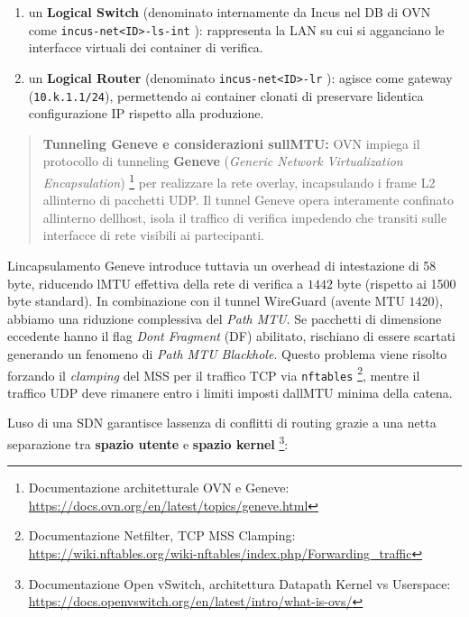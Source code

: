 \begin{enumerate}
\def\labelenumi{\arabic{enumi}.}
\tightlist
\item
  un \textbf{Logical Switch} (denominato internamente da Incus nel DB di
  OVN come \passthrough{\lstinline!incus-net<ID>-ls-int!} ):
  rappresenta la LAN su cui si agganciano le interfacce virtuali dei
  container di verifica.
\item
  un \textbf{Logical Router} (denominato
  \passthrough{\lstinline!incus-net<ID>-lr!} ):
  agisce come gateway (\passthrough{\lstinline!10.k.1.1/24!}),
  permettendo ai container clonati di preservare
  l\textquotesingle identica configurazione IP rispetto alla produzione.
\end{enumerate}

\begin{quote}
\textbf{Tunneling Geneve e considerazioni sull\textquotesingle MTU:} OVN
impiega il protocollo di tunneling \textbf{Geneve} (\emph{Generic
Network Virtualization Encapsulation}) \footnote{\label{fn:ref_17}Documentazione
  architetturale OVN e Geneve:
  \url{https://docs.ovn.org/en/latest/topics/geneve.html}} per
realizzare la rete overlay, incapsulando i frame L2
all\textquotesingle interno di pacchetti UDP. Il tunnel Geneve opera
interamente confinato all\textquotesingle interno
dell\textquotesingle host, isola il traffico di verifica impedendo che
transiti sulle interfacce di rete visibili ai partecipanti.
\end{quote}

L\textquotesingle incapsulamento Geneve introduce tuttavia un overhead
di intestazione di 58 byte, riducendo l\textquotesingle MTU effettiva
della rete di verifica a \(1442\) byte (rispetto ai 1500 byte standard).
In combinazione con il tunnel WireGuard (avente MTU \(1420\)), abbiamo
una riduzione complessiva del \emph{Path MTU}. Se pacchetti di
dimensione eccedente hanno il flag \emph{Don\textquotesingle t Fragment}
(DF) abilitato, rischiano di essere scartati generando un fenomeno di
\emph{Path MTU Blackhole}. Questo problema viene risolto forzando il
\emph{clamping} del MSS per il traffico TCP via
\passthrough{\lstinline!nftables!} \footnote{\label{fn:ref_18}Documentazione Netfilter,
  TCP MSS Clamping:
  \url{https://wiki.nftables.org/wiki-nftables/index.php/Forwarding_traffic}},
mentre il traffico UDP deve rimanere entro i limiti imposti
dall\textquotesingle MTU minima della catena.

L\textquotesingle uso di una SDN garantisce l\textquotesingle assenza di
conflitti di routing grazie a una netta separazione tra \textbf{spazio
utente} e \textbf{spazio kernel} \footnote{\label{fn:ref_19}Documentazione Open vSwitch,
  architettura Datapath Kernel vs Userspace:
  \url{https://docs.openvswitch.org/en/latest/intro/what-is-ovs/}}:

